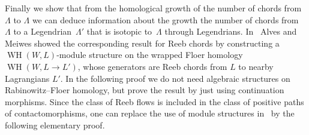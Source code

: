 \documentclass{amsart}
\newcommand{\WslantH}{\operatorname{WH}}
\theoremstyle{definition}
\theoremstyle{remark}
\numberwithin{equation}{section}
\begin{document}
Finally we show that from the homological growth of the number of chords from $\Lambda$ to $\Lambda$ we can deduce information about the growth the number of chords from~$\Lambda$ to a Legendrian~$\Lambda'$ that is isotopic to~$\Lambda$ through Legendrians. In~\cite{AM17} Alves and Meiwes showed the corresponding result for Reeb chords by constructing a $\WslantH(W,L)$-module structure on the wrapped Floer homology $\WslantH(W,L\to L')$, whose generators are Reeb chords from $L$ to nearby Lagrangians $L'$. In the following proof we do not need algebraic structures on Rabinowitz--Floer homology, but prove the result by just using continuation morphisms. Since the class of Reeb flows is included in the class of positive paths of contactomorphisms, one can replace the use of module structures in~\cite{AM17} by the following elementary proof.
\end{document}
